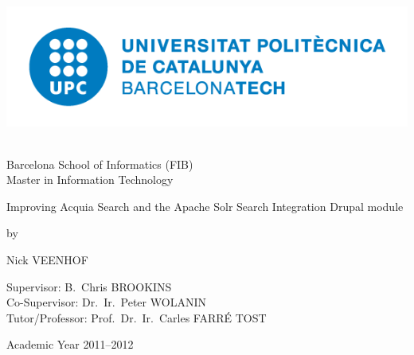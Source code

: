 

\begin{titlepage}

\setlength{\hoffset}{-1in}
\setlength{\voffset}{-1in}
\setlength{\topmargin}{1.5cm}
\setlength{\headheight}{0.5cm}
\setlength{\headsep}{1cm}
\setlength{\oddsidemargin}{3cm}
\setlength{\evensidemargin}{3cm}
\setlength{\footskip}{1.5cm}
\enlargethispage{1cm}


\fontsize{12pt}{14pt}
\selectfont

\begin{center}

\includegraphics[height=5cm]{images/logoUPCblau-complet}

\vspace{0.5cm}

Barcelona School of Informatics (FIB)\\
Master in Information Technology\\

\vspace{3.5cm}

\fontsize{17.28pt}{21pt}
\selectfont

Improving Acquia Search and the Apache Solr Search Integration Drupal module\\

\fontsize{12pt}{14pt}
\selectfont

\vspace{.6cm}

by 

\vspace{.4cm}

Nick VEENHOF

\vspace{3.5cm}

Supervisor: B.~Chris BROOKINS\\
Co-Supervisor: Dr.~Ir.~Peter WOLANIN\\
Tutor/Professor: Prof.~Dr.~Ir.~Carles FARR\'{E} TOST\\

\vspace{2cm}

Academic Year 2011--2012

\end{center}
\end{titlepage}
